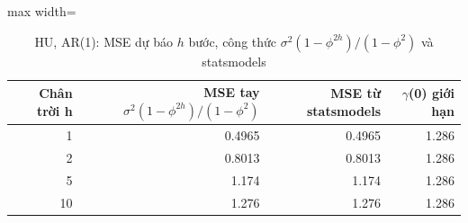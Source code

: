 \begin{table}[H]
\centering\footnotesize
\caption{HU, AR(1): MSE dự báo $h$ bước, công thức $\sigma^2(1-\phi^{2h})/(1-\phi^2)$ và statsmodels}\label{tab:tab_b11_06_ar1_forecast_mse}
\begin{adjustbox}{max width=\linewidth}
\begin{tabular}{|r|r|r|r|}
\toprule
Chân trời h & MSE tay $\sigma^2(1-\phi^{2h})/(1-\phi^2)$ & MSE từ statsmodels & $\gamma$(0) giới hạn \\
\midrule
1 & 0.4965 & 0.4965 & 1.286 \\
2 & 0.8013 & 0.8013 & 1.286 \\
5 & 1.174 & 1.174 & 1.286 \\
10 & 1.276 & 1.276 & 1.286 \\
\bottomrule
\end{tabular}
\end{adjustbox}
\end{table}
